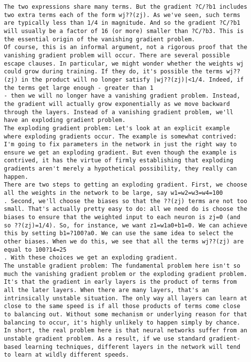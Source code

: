 \begin{lstlisting}
The two expressions share many terms. But the gradient ?C/?b1 includes two extra terms each of the form wj??(zj). As we've seen, such terms are typically less than 1/4 in magnitude. And so the gradient ?C/?b1 will usually be a factor of 16 (or more) smaller than ?C/?b3. This is the essential origin of the vanishing gradient problem.
Of course, this is an informal argument, not a rigorous proof that the vanishing gradient problem will occur. There are several possible escape clauses. In particular, we might wonder whether the weights wj
could grow during training. If they do, it's possible the terms wj??(zj) in the product will no longer satisfy |wj??(zj)|<1/4. Indeed, if the terms get large enough - greater than 1
- then we will no longer have a vanishing gradient problem. Instead, the gradient will actually grow exponentially as we move backward through the layers. Instead of a vanishing gradient problem, we'll have an exploding gradient problem.
The exploding gradient problem: Let's look at an explicit example where exploding gradients occur. The example is somewhat contrived: I'm going to fix parameters in the network in just the right way to ensure we get an exploding gradient. But even though the example is contrived, it has the virtue of firmly establishing that exploding gradients aren't merely a hypothetical possibility, they really can happen.
There are two steps to getting an exploding gradient. First, we choose all the weights in the network to be large, say w1=w2=w3=w4=100
. Second, we'll choose the biases so that the ??(zj) terms are not too small. That's actually pretty easy to do: all we need do is choose the biases to ensure that the weighted input to each neuron is zj=0 (and so ??(zj)=1/4). So, for instance, we want z1=w1a0+b1=0. We can achieve this by setting b1=?100?a0. We can use the same idea to select the other biases. When we do this, we see that all the terms wj??(zj) are equal to 100?14=25
. With these choices we get an exploding gradient.
The unstable gradient problem: The fundamental problem here isn't so much the vanishing gradient problem or the exploding gradient problem. It's that the gradient in early layers is the product of terms from all the later layers. When there are many layers, that's an intrinsically unstable situation. The only way all layers can learn at close to the same speed is if all those products of terms come close to balancing out. Without some mechanism or underlying reason for that balancing to occur, it's highly unlikely to happen simply by chance. In short, the real problem here is that neural networks suffer from an unstable gradient problem. As a result, if we use standard gradient-based learning techniques, different layers in the network will tend to learn at wildly different speeds.

\end{lstlisting}
